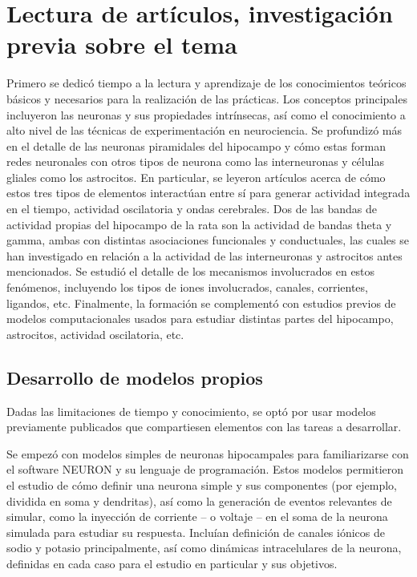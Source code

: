 \documentclass[12pt,a4paper]{report}
\begin{document}
\section{Lectura de artículos, investigación previa sobre el tema}

Primero se dedicó tiempo a la lectura y aprendizaje de los conocimientos teóricos básicos y necesarios para la realización de las prácticas. Los conceptos principales incluyeron las neuronas y sus propiedades intrínsecas, así como el conocimiento a alto nivel de las técnicas de experimentación en neurociencia. Se profundizó más en el detalle de las neuronas piramidales del hipocampo y cómo estas forman redes neuronales con otros tipos de neurona como las interneuronas y células gliales como los astrocitos. En particular, se leyeron artículos acerca de cómo estos tres tipos de elementos interactúan entre sí para generar actividad integrada en el tiempo, actividad oscilatoria y ondas cerebrales. Dos de las bandas de actividad propias del hipocampo de la rata son la actividad de bandas theta y gamma, ambas con distintas asociaciones funcionales y conductuales, las cuales se han investigado en relación a la actividad de las interneuronas y astrocitos antes mencionados. Se estudió el detalle de los mecanismos involucrados en estos fenómenos, incluyendo los tipos de iones involucrados, canales, corrientes, ligandos, etc. Finalmente, la formación se complementó con estudios previos de modelos computacionales usados para estudiar distintas partes del hipocampo, astrocitos, actividad oscilatoria, etc.

\subsection{Desarrollo de modelos propios}

Dadas las limitaciones de tiempo y conocimiento, se optó por usar modelos previamente publicados que compartiesen elementos con las tareas a desarrollar. 

Se empezó con modelos simples de neuronas hipocampales para familiarizarse con el software NEURON y su lenguaje de programación. Estos modelos permitieron el estudio de cómo definir una neurona simple y sus componentes (por ejemplo, dividida en soma y dendritas), así como la generación de eventos relevantes de simular, como la inyección de corriente – o voltaje – en el soma de la neurona simulada para estudiar su respuesta. Incluían definición de canales iónicos de sodio y potasio principalmente, así como dinámicas intracelulares de la neurona, definidas en cada caso para el estudio en particular y sus objetivos.
\end{document}

